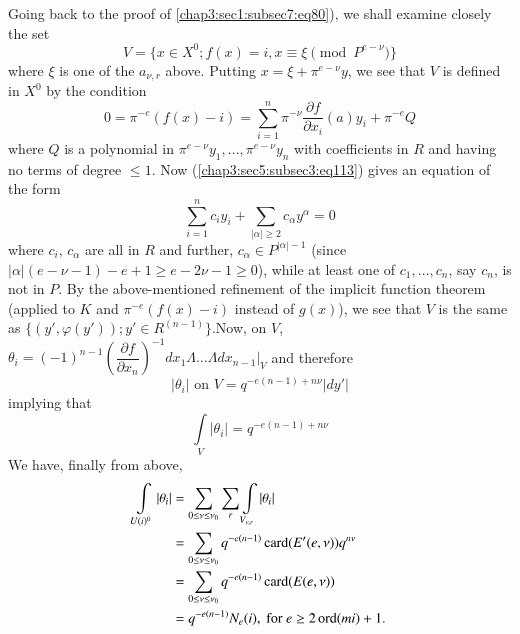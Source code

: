 Going back to the proof of \ref{chap3:sec1:subsec7:eq80}), we shall
examine closely the set
$$
V=\{x\in X^{0}; f(x)=i, x\equiv \xi \pmod{P^{e-\nu}}\}
$$
where $\xi$ is one of the $a_{\nu,r}$ above. Putting
$x=\xi+\pi^{e-\nu}y$, we see that $V$ is defined in $X^{0}$ by the
condition
\begin{equation*}
0=\pi^{-e}(f(x)-i)=\sum^{n}_{i=1}\pi^{-\nu}\frac{\partial f}{\partial
  x_{i}} (a)y_{i}+\pi^{-e}Q\tag{113}\label{chap3:sec5:subsec3:eq113}
\end{equation*}
where $Q$ is a polynomial in
$\pi^{e-\nu}y_{1},\ldots, \pi^{e-\nu}y_{n}$ with coefficients in $R$
and having no terms of degree $\leq
1$. Now (\ref{chap3:sec5:subsec3:eq113}) gives an
equation of the form
$$
\sum^{n}_{i=1}c_{i}y_{i}+\sum_{|\alpha|\geq 2}c_{\alpha}y^{\alpha}=0
$$
where $c_{i}$, $c_{\alpha}$ are all in $R$ and further, $c_{\alpha}\in
P^{|\alpha|-1}$ (since $|\alpha|(e-\nu-1)-e+1\geq e-2\nu-1\geq 0$),
while at least one of $c_{1},\ldots,c_{n}$, say $c_{n}$, is not in
$P$. By the above-mentioned refinement of the implicit function
theorem (applied to $K$ and $\pi^{-e}(f(x)-i)$ instead of $g(x)$), we
see that $V$ is the same as $\{(y',\varphi(y'));y'\in
R^{(n-1)}\}$.\pageoriginale Now, on $V$,
$\theta_{i}=(-1)^{n-1}\left(\dfrac{\partial f}{\partial
  x_{n}}\right)^{-1}dx_{1}\Lambda\ldots\Lambda dx_{n-1}|_{V}$ and
therefore
$$
|\theta_{i}|\text{ on } V=q^{-e(n-1)+n\nu}|dy'|
$$
implying that
$$
\int\limits_{V}|\theta_{i}|=q^{-e(n-1)+n\nu}
$$
We have, finally from above,
\begin{align*}
  \int\limits_{U(i)^{0}}|\theta_{i}| &= \sum_{0\leq \nu\leq
    \nu_{0}}\sum_{r}\int\limits_{V_{\nu,r}}|\theta_{i}|\\
  &= \sum_{0\leq \nu\leq \nu_{0}}q^{-e(n-1)}\operatorname{card} (E'(e,\nu))q^{n\nu}\\
  &= \sum_{0\leq \nu\leq \nu_{0}}q^{-e(n-1)}\operatorname{card} (E(e,\nu))\\
  &= q^{-e(n-1)}N_{e}(i), \text{ for } e\geq 2\operatorname{ord} (mi)+1.
\end{align*}

